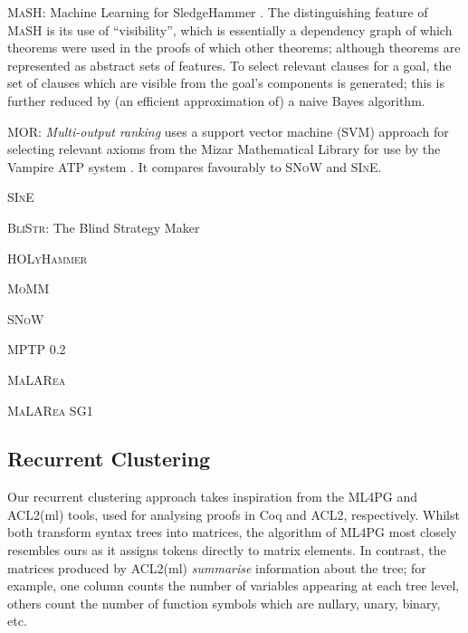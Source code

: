 \begin{description}

  \item{\textsc{MaSH}}: Machine Learning for SledgeHammer \citep{kuhlwein2013mash}. The distinguishing feature of \textsc{MaSH} is its use of ``visibility'', which is essentially a dependency graph of which theorems were used in the proofs of which other theorems; although theorems are represented as abstract sets of features. To select relevant clauses for a goal, the set of clauses which are visible from the goal's components is generated; this is further reduced by (an efficient approximation of) a naive Bayes algorithm.

  \item{\textsc{MOR}}: \emph{Multi-output ranking} uses a support vector machine (SVM) approach for selecting relevant axioms from the Mizar Mathematical Library for use by the Vampire ATP system \citep{alama2014premise}. \iffalse TODO: describe the kernel, as that's the interesting bit \fi It compares favourably to \textsc{SNoW} and \textsc{SInE}.

  \item{\textsc{SInE}}
  \item{\textsc{BliStr}}: The Blind Strategy Maker
  \item{\textsc{HOLyHammer}}
  \item{\textsc{MoMM}}
  \item{\textsc{SNoW}}
  \item{\textsc{MPTP 0.2}}
  \item{\textsc{MaLARea}}
  \item{\textsc{MaLARea SG1}}

\end{description}

\subsection{Recurrent Clustering}
\label{sec:clusteringexpressions}

Our recurrent clustering approach takes inspiration from the ML4PG \citep{journals/corr/abs-1212-3618} and ACL2(ml) \citep{heras2013proof} tools, used for analysing proofs in Coq and ACL2, respectively. Whilst both transform syntax trees into matrices, the algorithm of ML4PG most closely resembles ours as it assigns tokens directly to matrix elements. In contrast, the matrices produced by ACL2(ml) \emph{summarise} information about the tree; for example, one column counts the number of variables appearing at each tree level, others count the number of function symbols which are nullary, unary, binary, etc.

